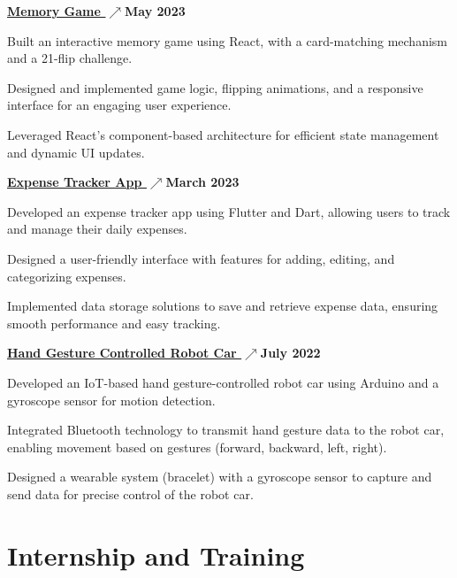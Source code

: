 \documentclass[letterpaper,10pt]{article}
\newcommand{\heading}[2]{
  \hspace{10pt}#1\hfill#2\\
}
\newcommand{\headingBf}[2]{
  \heading{\textbf{#1}}{\textbf{#2}}
}
\newenvironment{resume_list}{
  \vspace{-7pt}
  \begin{itemize}[itemsep=-2px, parsep=1pt, leftmargin=30pt]
}{
  \end{itemize}
}
\begin{document}
    \headingBf {\underline{\href{https://github.com/surajkr97/MemoryGame/tree/master/matchthecards}{Memory Game \(\nearrow\)}}}{May 2023}
    \begin{resume_list}
    \item Built an interactive memory game using React, with a card-matching mechanism and a 21-flip challenge.
    \item Designed and implemented game logic, flipping animations, and a responsive interface for an engaging user experience.
    \item Leveraged React's component-based architecture for efficient state management and dynamic UI updates.
    \end{resume_list}
    
    \headingBf {\underline{\href{https://github.com/surajkr97/Expense-Tracker-App}{Expense Tracker App \(\nearrow\)}}}{March 2023}
    \begin{resume_list}
    \item Developed an expense tracker app using Flutter and Dart, allowing users to track and manage their daily expenses.
    \item Designed a user-friendly interface with features for adding, editing, and categorizing expenses.
    \item Implemented data storage solutions to save and retrieve expense data, ensuring smooth performance and easy tracking.
  \end{resume_list}

    \headingBf {\underline{\href{https://surajkr97.hashnode.dev/exploring-the-world-of-iot-from-robo-cars-to-robo-warrior?source=more_articles_bottom_blogs}{Hand Gesture Controlled Robot Car \(\nearrow\)}}}{July 2022}
    \begin{resume_list}
    \item Developed an IoT-based hand gesture-controlled robot car using Arduino and a gyroscope sensor for motion detection.
    \item Integrated Bluetooth technology to transmit hand gesture data to the robot car, enabling movement based on gestures (forward, backward, left, right).
    \item Designed a wearable system (bracelet) with a gyroscope sensor to capture and send data for precise control of the robot car.
  \end{resume_list}


  \section{Internship and Training}
\end{document}
